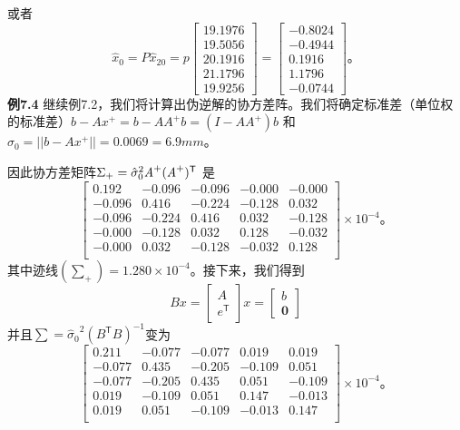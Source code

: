 或者
\begin{equation*}
	\hat{x}_{0}
	=P\hat{x}_{20}
	= p
	\begin{bmatrix}
		19.1976\\
		19.5056\\
		20.1916\\
		21.1796\\
		19.9256
	\end{bmatrix}
	=\begin{bmatrix}
		-0.8024\\
		-0.4944\\
		0.1916\\
		1.1796\\
		-0.0744
	\end{bmatrix}\text{。}
\end{equation*}
\textbf{例7.4} 继续例7.2，我们将计算出伪逆解的协方差阵。我们将确定标准差（单位权的标准差）$b - Ax^{+} = b - AA^{+}b = (I - AA^{+})b$ 和 $\hat{\sigma}_0 = ||b - Ax^{+}|| = 
0.0069 = 6.9mm$。
\par\noindent
因此协方差矩阵$\Sigma_+ = {\hat{\sigma}_0}^2\emph{A}^{+}(\emph{A}^{+})^\mathsf{T}$ 是
\begin{equation*}
	\begin{bmatrix}
		0.192 & -0.096 & -0.096 & -0.000 & -0.000\\
		-0.096 & 0.416  & -0.224 & -0.128 & 0.032\\
		-0.096 & -0.224 & 0.416  & 0.032  & -0.128\\
		-0.000 & -0.128 & 0.032  & 0.128  & -0.032\\
		-0.000 & 0.032  & -0.128 & -0.032 & 0.128\\
	\end{bmatrix}\times10^{-4}\text{。}
\end{equation*}
其中迹线$(\sum_+) = 1.280 \times 10^{-4}$。接下来，我们得到
\begin{equation*}
	Bx
	=
	\begin{bmatrix}
		A\\
		e^\mathsf{T}
	\end{bmatrix}
	x
	=
	\begin{bmatrix}
		b\\
		\mathbf{0}
	\end{bmatrix}
\end{equation*}
并且$\sum = {\hat{\sigma}_0}^2(B^\mathsf{T}B)^{-1}$变为
\begin{equation*}
	\begin{bmatrix}
		0.211 &-0.077 &-0.077 &0.019  &0.019\\
		-0.077 &0.435  &-0.205 &-0.109 &0.051\\
		-0.077 &-0.205 &0.435  &0.051  &-0.109\\
		0.019 &-0.109 &0.051  &0.147  &-0.013\\
		0.019  &0.051  &-0.109 &-0.013 &0.147\\
	\end{bmatrix}\times10^{-4}\text{。}
\end{equation*}
